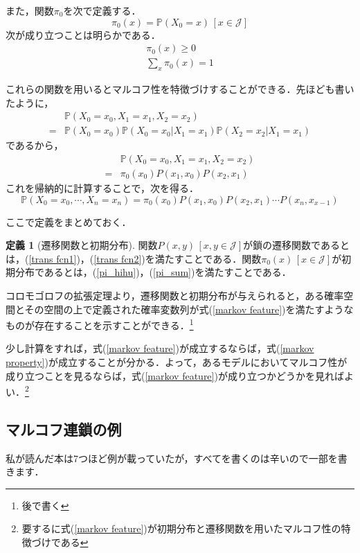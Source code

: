 \documentclass[12pt, a4paper]{jsarticle}
\theoremstyle{definition}
\newtheorem{defn}{定義}[section]
\begin{document}
また，関数$\pi_0$を次で定義する．
\begin{equation}
	\pi_0(x) = \mathbb{P}(X_0 = x ) \, [x \in \mathcal{J}]
\end{equation}
次が成り立つことは明らかである．
\begin{align}
	\pi_0(x) \ge 0 \label{pi_hihu}  \\
	\sum_x \pi_0(x) = 1 \label{pi_sum} 
\end{align}

これらの関数を用いるとマルコフ性を特徴づけすることができる．先ほども書いたように，
\begin{align*}
	& \mathbb{P}(X_0 = x_0 , X_1 = x_1, X_2 = x_2) \\
	=&\mathbb{P}(X_0 = x_0)\mathbb{P}(X_0 = x_0| X_1 = x_1)\mathbb{P}(X_2 = x_2 | X_1 = x_1)
\end{align*}
であるから，
\begin{align*}
	& \mathbb{P}(X_0 = x_0 , X_1 = x_1, X_2 = x_2) \\
	=& \pi_0(x_0) P(x_1,x_0)P(x_2,x_1)
\end{align*}
これを帰納的に計算することで，次を得る．
\begin{equation}
\mathbb{P}(X_0 = x_0 , \cdots , X_n = x_n) = \pi_0(x_0) P(x_1,x_0)P(x_2,x_1)\cdots P(x_n,x_{x-1}) \label{markov feature} 
\end{equation}

ここで定義をまとめておく．
\begin{screen}
	\begin{defn}[遷移関数と初期分布]
		関数$P(x,y)\,[x,y \in \mathcal{J}]$が鎖の遷移関数であるとは，(\ref{trans fcn1})，(\ref{trans fcn2})を満たすことである．関数$\pi_0(x)\, [x \in \mathcal{J}]$が初期分布であるとは，(\ref{pi_hihu})，(\ref{pi_sum})を満たすことである．
	\end{defn}
\end{screen}

コロモゴロフの拡張定理より，遷移関数と初期分布が与えられると，ある確率空間とその空間の上で定義された確率変数列が式(\ref{markov feature})を満たすようなものが存在することを示すことができる．\footnote{後で書く}

少し計算をすれば，式(\ref{markov feature})が成立するならば，式(\ref{markov property})が成立することが分かる．よって，あるモデルにおいてマルコフ性が成り立つことを見るならば，式(\ref{markov feature})が成り立つかどうかを見ればよい．\footnote{要するに式(\ref{markov feature})が初期分布と遷移関数を用いたマルコフ性の特徴づけである}

\subsection{マルコフ連鎖の例}
私が読んだ本は7つほど例が載っていたが，すべてを書くのは辛いので一部を書きます．
\end{document}
